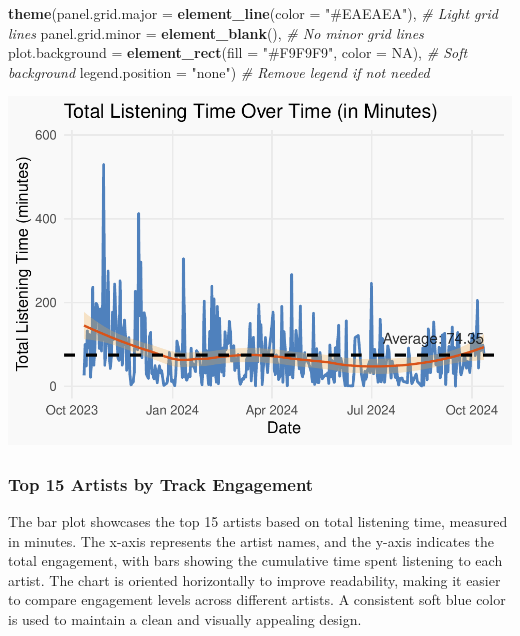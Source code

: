 \documentclass[
]{article}
\newenvironment{Shaded}{\begin{snugshade}}{\end{snugshade}}
\newcommand{\AttributeTok}[1]{\textcolor[rgb]{0.13,0.29,0.53}{#1}}
\newcommand{\CommentTok}[1]{\textcolor[rgb]{0.56,0.35,0.01}{\textit{#1}}}
\newcommand{\ConstantTok}[1]{\textcolor[rgb]{0.56,0.35,0.01}{#1}}
\newcommand{\FunctionTok}[1]{\textcolor[rgb]{0.13,0.29,0.53}{\textbf{#1}}}
\newcommand{\NormalTok}[1]{#1}
\newcommand{\StringTok}[1]{\textcolor[rgb]{0.31,0.60,0.02}{#1}}
\begin{document}
\begin{Shaded}
\begin{Highlighting}[]
  \FunctionTok{theme}\NormalTok{(}\AttributeTok{panel.grid.major =} \FunctionTok{element\_line}\NormalTok{(}\AttributeTok{color =} \StringTok{"\#EAEAEA"}\NormalTok{),  }\CommentTok{\# Light grid lines}
        \AttributeTok{panel.grid.minor =} \FunctionTok{element\_blank}\NormalTok{(),  }\CommentTok{\# No minor grid lines}
        \AttributeTok{plot.background =} \FunctionTok{element\_rect}\NormalTok{(}\AttributeTok{fill =} \StringTok{"\#F9F9F9"}\NormalTok{, }\AttributeTok{color =} \ConstantTok{NA}\NormalTok{),  }\CommentTok{\# Soft background}
        \AttributeTok{legend.position =} \StringTok{"none"}\NormalTok{)  }\CommentTok{\# Remove legend if not needed}
\end{Highlighting}
\end{Shaded}

\includegraphics{SpotifyProjectPDF_files/figure-latex/unnamed-chunk-12-1.pdf}

\subsubsection{Top 15 Artists by Track
Engagement}\label{top-15-artists-by-track-engagement}

The bar plot showcases the top 15 artists based on total listening time,
measured in minutes. The x-axis represents the artist names, and the
y-axis indicates the total engagement, with bars showing the cumulative
time spent listening to each artist. The chart is oriented horizontally
to improve readability, making it easier to compare engagement levels
across different artists. A consistent soft blue color is used to
maintain a clean and visually appealing design.
\end{document}
